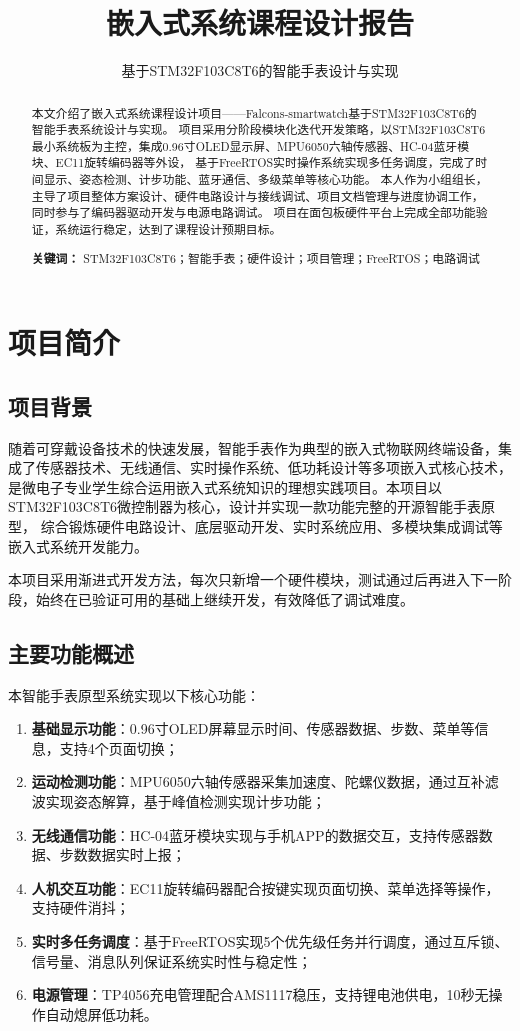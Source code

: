 \documentclass[12pt, a4paper]{ctexart}
\title{嵌入式系统课程设计报告}
\subtitle{基于STM32F103C8T6的智能手表设计与实现}
\begin{document}
\makecover

\newpage
\begin{abstract}
本文介绍了嵌入式系统课程设计项目——Falcons-smartwatch基于STM32F103C8T6的智能手表系统设计与实现。
项目采用分阶段模块化迭代开发策略，以STM32F103C8T6最小系统板为主控，集成0.96寸OLED显示屏、MPU6050六轴传感器、HC-04蓝牙模块、EC11旋转编码器等外设，
基于FreeRTOS实时操作系统实现多任务调度，完成了时间显示、姿态检测、计步功能、蓝牙通信、多级菜单等核心功能。
本人作为小组组长，主导了项目整体方案设计、硬件电路设计与接线调试、项目文档管理与进度协调工作，同时参与了编码器驱动开发与电源电路调试。
项目在面包板硬件平台上完成全部功能验证，系统运行稳定，达到了课程设计预期目标。
\par
\textbf{关键词：} STM32F103C8T6；智能手表；硬件设计；项目管理；FreeRTOS；电路调试
\end{abstract}
\clearpage

\tableofcontents
\clearpage

\setcounter{page}{1}

\section{项目简介}
\subsection{项目背景}
随着可穿戴设备技术的快速发展，智能手表作为典型的嵌入式物联网终端设备，集成了传感器技术、无线通信、实时操作系统、低功耗设计等多项嵌入式核心技术，
是微电子专业学生综合运用嵌入式系统知识的理想实践项目。本项目以STM32F103C8T6微控制器为核心，设计并实现一款功能完整的开源智能手表原型，
综合锻炼硬件电路设计、底层驱动开发、实时系统应用、多模块集成调试等嵌入式系统开发能力。

本项目采用渐进式开发方法，每次只新增一个硬件模块，测试通过后再进入下一阶段，始终在已验证可用的基础上继续开发，有效降低了调试难度。

\subsection{主要功能概述}
本智能手表原型系统实现以下核心功能：
\begin{enumerate}
    \item \textbf{基础显示功能}：0.96寸OLED屏幕显示时间、传感器数据、步数、菜单等信息，支持4个页面切换；
    \item \textbf{运动检测功能}：MPU6050六轴传感器采集加速度、陀螺仪数据，通过互补滤波实现姿态解算，基于峰值检测实现计步功能；
    \item \textbf{无线通信功能}：HC-04蓝牙模块实现与手机APP的数据交互，支持传感器数据、步数数据实时上报；
    \item \textbf{人机交互功能}：EC11旋转编码器配合按键实现页面切换、菜单选择等操作，支持硬件消抖；
    \item \textbf{实时多任务调度}：基于FreeRTOS实现5个优先级任务并行调度，通过互斥锁、信号量、消息队列保证系统实时性与稳定性；
    \item \textbf{电源管理}：TP4056充电管理配合AMS1117稳压，支持锂电池供电，10秒无操作自动熄屏低功耗。
\end{enumerate}
\end{document}
